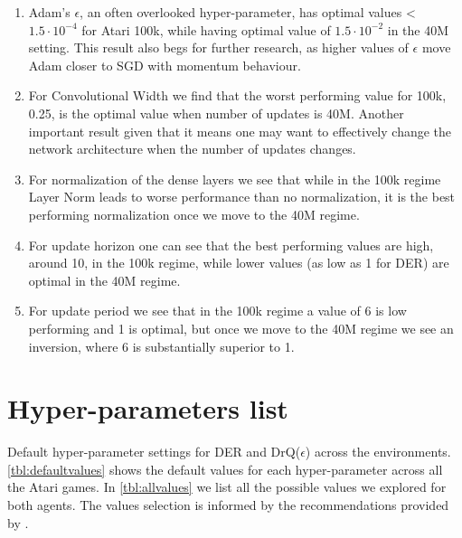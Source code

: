 \documentclass[10pt]{article} %
\begin{document}
\begin{enumerate}
    \item Adam's $\epsilon$, an often overlooked hyper-parameter, has optimal values < $1.5 \cdot 10^{-4}$ for Atari 100k, while having optimal value of $1.5 \cdot 10^{-2}$ in the 40M setting. This result also begs for further research, as higher values of $\epsilon$ move Adam closer to SGD with momentum behaviour.
    \item For Convolutional Width we find that the worst performing value for 100k, 0.25, is the optimal value when number of updates is 40M. Another important result given that it means one may want to effectively change the network architecture when the number of updates changes.
    \item For normalization of the dense layers we see that while in the 100k regime Layer Norm leads to worse performance than no normalization, it is the best performing normalization once we move to the 40M regime.
    \item For update horizon one can see that the best performing values are high, around 10, in the 100k regime, while lower values (as low as 1 for DER) are optimal in the 40M regime.
    \item For update period we see that in the 100k regime a value of 6 is low performing and 1 is optimal, but once we move to the 40M regime we see an inversion, where 6 is substantially superior to 1.
\end{enumerate}

\clearpage

\section{Hyper-parameters list}
\label{sec:list_hyperparameters}

Default hyper-parameter settings for DER and DrQ($\epsilon$) across the environments. \autoref{tbl:defaultvalues} shows the default values for each hyper-parameter across all the Atari games. In \autoref{tbl:allvalues} we list all the possible values we explored for both agents. The values selection is informed by the recommendations provided by \citet{joajo2021lifting}.
\end{document}
